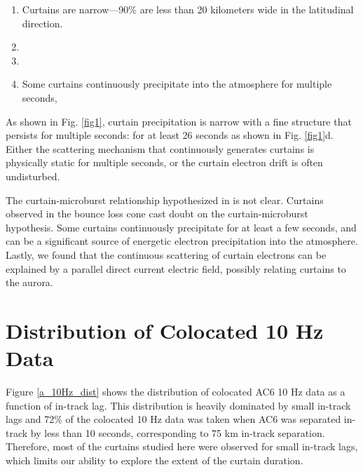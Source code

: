 \documentclass[draft]{agujournal2019}
\begin{document}
\begin{enumerate}
\item Curtains are narrow---90\% are less than 20 kilometers wide in the latitudinal direction.
\item {}
\item {}
\item Some curtains continuously precipitate into the atmosphere for multiple seconds, 
\end{enumerate}

As shown in Fig. \ref{fig1}, curtain precipitation is narrow with a fine structure that persists for multiple seconds: for at least 26 seconds as shown in Fig. \ref{fig1}d. Either the scattering mechanism that continuously generates curtains is physically static for multiple seconds, or the curtain electron drift is often undisturbed. 

The curtain-microburst relationship hypothesized in  is not clear. Curtains observed in the bounce loss cone cast doubt on the curtain-microburst hypothesis. Some curtains continuously precipitate for at least a few seconds, and can be a significant source of energetic electron precipitation into the atmosphere. Lastly, we found that the continuous scattering of curtain electrons can be explained by a parallel direct current electric field, possibly relating curtains to the aurora.

\appendix

\section{Distribution of Colocated 10 Hz Data}
Figure \ref{a_10Hz_dist} shows the distribution of colocated AC6 10 Hz data as a function of in-track lag. This distribution is heavily dominated by small in-track lags and 72\% of the colocated 10 Hz data was taken when AC6 was separated in-track by less than 10 seconds, corresponding to 75 km in-track separation. Therefore, most of the curtains studied here were observed for small in-track lags, which limits our ability to explore the extent of the curtain duration.
\end{document}
